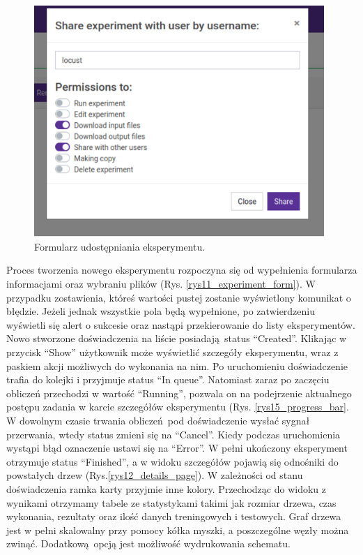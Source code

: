 \begin{figure}[htb]
	\centering
	\includegraphics[width=11cm]{grafika/share_form.eps}
	\caption{Formularz udostępniania eksperymentu.}
	\label{rys14_share_form}
\end{figure}

Proces tworzenia nowego eksperymentu rozpoczyna się od wypełnienia formularza informacjami oraz wybraniu plików (Rys. \ref{rys11_experiment_form}). W przypadku zostawienia, któreś wartości pustej zostanie wyświetlony komunikat o błędzie. Jeżeli jednak wszystkie pola będą wypełnione, po zatwierdzeniu wyświetli się alert o sukcesie oraz nastąpi przekierowanie do listy eksperymentów. Nowo stworzone doświadczenia na liście posiadają status \enquote{Created}. Klikając w przycisk \enquote{Show} użytkownik może wyświetlić szczegóły eksperymentu, wraz z paskiem akcji możliwych do wykonania na nim. Po uruchomieniu doświadczenie trafia do kolejki i przyjmuje status \enquote{In queue}. Natomiast zaraz po zaczęciu obliczeń przechodzi w wartość \enquote{Running}, pozwala on na podejrzenie aktualnego postępu zadania w karcie szczegółów eksperymentu (Rys. \ref{rys15_progress_bar}. W dowolnym czasie trwania obliczeń pod doświadczenie wysłać sygnał przerwania, wtedy status zmieni się na \enquote{Cancel}. Kiedy podczas uruchomienia wystąpi błąd oznaczenie ustawi się na \enquote{Error}. W pełni ukończony eksperyment otrzymuje status \enquote{Finished}, a w widoku szczegółów pojawią się odnośniki do powstałych drzew (Rys.\ref{rys12_details_page}). W zależności od stanu doświadczenia ramka karty przyjmie inne kolory. Przechodząc do widoku z wynikami otrzymamy tabele ze statystykami takimi jak rozmiar drzewa, czas wykonania, rezultaty oraz ilość danych treningowych i testowych. Graf drzewa jest w pełni skalowalny przy pomocy kółka myszki, a poszczególne węzły można zwinąć. Dodatkową opcją jest możliwość wydrukowania schematu.




